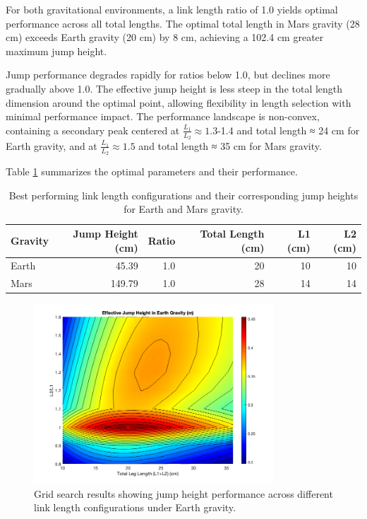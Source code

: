 For both gravitational environments, a link length ratio of 1.0 yields optimal performance across all total lengths. The optimal total length in Mars gravity (28 cm) exceeds Earth gravity (20 cm) by 8 cm, achieving a 102.4 cm greater maximum jump height.

Jump performance degrades rapidly for ratios below 1.0, but declines more gradually above 1.0. The effective jump height is less steep in the total length dimension around the optimal point, allowing flexibility in length selection with minimal performance impact. The performance landscape is non-convex, containing a secondary peak centered at \(\frac{L_1}{L_2} \approx 1.3\)-1.4 and total length ≈ 24 cm for Earth gravity, and at \(\frac{L_1}{L_2} \approx 1.5\) and total length ≈ 35 cm for Mars gravity.

Table \ref{tab:results:grid_search:best_jumps} summarizes the optimal parameters and their performance.
\begin{table}[h]

    \centering
    \begin{tabular}{lrrrrr}
        \hline
        Gravity & Jump Height (cm) & Ratio & Total Length (cm) & L1 (cm) & L2 (cm) \\
        \hline
        Earth & 45.39 & 1.0 & 20 & 10 & 10 \\
        Mars & 149.79 & 1.0 & 28 & 14 & 14 \\
        \hline
    \end{tabular}
    \caption{Best performing link length configurations and their corresponding jump heights for Earth and Mars gravity.}
    \label{tab:results:grid_search:best_jumps}
\end{table}


\begin{figure}[h]
    \centering
    \includegraphics[width=0.8\textwidth]{Images/results/grid_search_earth.png}
    \caption{Grid search results showing jump height performance across different link length configurations under Earth gravity.}
    \label{fig:results:grid_search_earth}
\end{figure}



